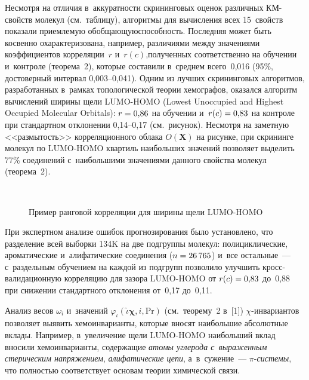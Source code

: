 \begin{multicols}{2}
     
     Несмотря на отличия в~аккуратности скрининговых оценок различных 
КМ-свойств молекул (см.\ таб\-ли\-цу), алгоритмы для вычисления всех 
15~свойств показали приемлемую обобщающую\linebreak способность. Последняя 
может быть косвенно охарактеризована, например, различиями между 
значениями коэффициентов корреляции~$r$ и~$r(c)$,\linebreak полученных 
соответственно на обучении и~контроле (тео\-ре\-ма~2), которые составили 
в~среднем всего~0,016 (95\%, достоверный интервал 0,003--0,041). Одним из 
лучших скрининговых алгоритмов, разработанных в~рамках топологической 
теории хемографов, оказался алгоритм вычислений ширины щели 
 LUMO-HOMO (Lowest Unoccupied and Highest Occupied Molecular Orbitals): $r \hm= 0{,}86$ на обучении и~$r(c)\hm = 0{,}83$ на контроле 
при стандартном отклонении 0,14--0,17 (см.\ рисунок). Несмотря на заметную 
<<размытость>> корреляционного облака $O(\mathbf{X})$ на рисунке, при 
скрининге молекул по LUMO-HOMO квартиль наибольших значений позволяет 
выделить 77\% соединений с~наибольшими значениями данного свойства 
молекул (тео\-ре\-ма~2).
     
     \begin{figure*} %
     \vspace*{1pt}
  \begin{center}  
    \mbox{%
\epsfxsize=102.258mm
}



     {\small Пример ранговой корреляции для ширины щели LUMO-HOMO}
     \end{center}
      \end{figure*}
     
     
     При экспертном анализе ошибок прогнозирования было установлено, что 
разделение всей выборки 134K на две подгруппы молекул: по\-ли\-цик\-ли\-че\-ские, 
ароматические и~алифатические \mbox{соединения} ($n \hm= 26\,765$) и~все 
остальные~--- с~раздельным обуче\-ни\-ем на каждой из подгрупп позволило 
улучшить кросс-ва\-ли\-да\-ци\-он\-ную корреляцию для зазора LUMO-HOMO 
от $r(c) \hm= 0{,}83$ до~0,88 при снижении стандартного отклонения от~0,17 
до~0,11. 
     
     Анализ весов $\omega_i$ и~значений $\varphi_\iota 
(\hat{\iota}\bm{\chi},i,\mathrm{Pr})$ (см.\ тео\-ре\-му~2 в~[1])  
$\chi$-ин\-ва\-ри\-ан\-тов позволяет выявить хемоинварианты, которые вносят 
наибольшие абсолютные вклады. Например, в~увеличение щели LUMO-HOMO 
наибольший вклад вносили хемоинварианты, содержащие \textit{атомы 
углерода с~выраженным стерическим напряжением}, \textit{алифатические 
цепи}, а~в~сужение~---  
$\pi$-\textit{сис\-те\-мы}, что полностью соответствует основам теории 
химической связи.
    

\end{multicols}
